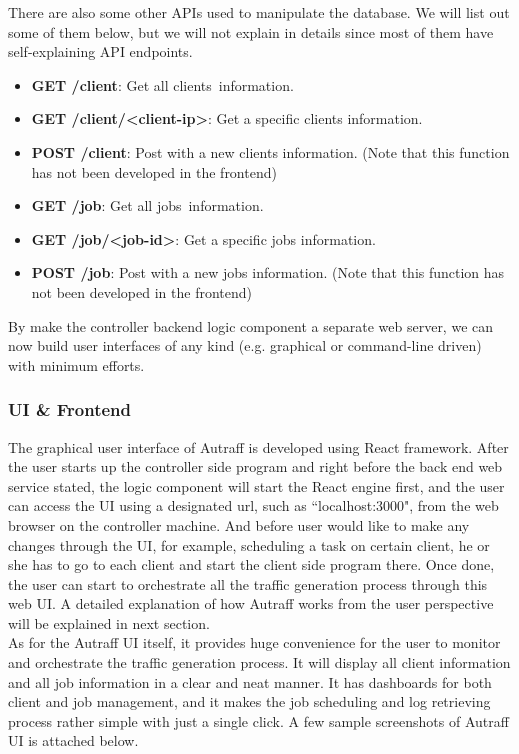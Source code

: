 \documentclass[12pt]{report}
\begin{document}
There are also some other APIs used to manipulate the database. We will list out some of them below, but we will not explain in details since most of them have self-explaining API endpoints.
\begin{itemize}
\item \textbf{GET /client}: Get all clients\textquotesingle \, information.
\item \textbf{GET /client/\textless client-ip\textgreater}: Get a specific client\textquotesingle s information.
\item \textbf{POST /client}: Post with a new client\textquotesingle s information. (Note that this function has not been developed in the frontend)
\item \textbf{GET /job}: Get all jobs\textquotesingle \, information.
\item \textbf{GET /job/\textless job-id\textgreater}: Get a specific job\textquotesingle s information.
\item \textbf{POST /job}: Post with a new job\textquotesingle s information. (Note that this function has not been developed in the frontend)
\end{itemize}

By make the controller backend logic component a separate web server, we can now build user interfaces of any kind (e.g. graphical or command-line driven) with minimum efforts.

\subsubsection{UI \& Frontend}
The graphical user interface of Autraff is developed using React framework. After the user starts up the controller side program and right before the back end web service stated, the logic component will start the React engine first, and the user can access the UI using a designated url, such as ``localhost:3000", from the web browser on the controller machine. And before user would like to make any changes through the UI, for example, scheduling a task on certain client, he or she has to go to each client and start the client side program there. Once done, the user can start to orchestrate all the traffic generation process through this web UI. A detailed explanation of how Autraff works from the user perspective will be explained in next section.\\

As for the Autraff UI itself, it provides huge convenience for the user to monitor and orchestrate the traffic generation process. It will display all client information and all job information in a clear and neat manner. It has dashboards for both client and job management, and it makes the job scheduling and log retrieving process rather simple with just a single click. A few sample screenshots of Autraff UI is attached below.\\
\end{document}
